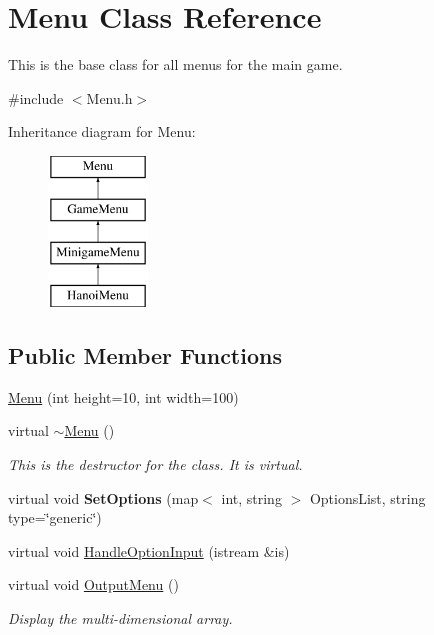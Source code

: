\hypertarget{classMenu}{\section{Menu Class Reference}
\label{classMenu}
}


This is the base class for all menus for the main game.  




{\ttfamily \#include $<$Menu.\-h$>$}

Inheritance diagram for Menu\-:\begin{figure}[H]
\begin{center}
\leavevmode
\includegraphics[height=4.000000cm]{classMenu}
\end{center}
\end{figure}
\subsection*{Public Member Functions}
\begin{DoxyCompactItemize}
\item 
\hyperlink{classMenu_a5a60e837b160444bee4525c06fd4c51e}{Menu} (int height=10, int width=100)
\item 
\hypertarget{classMenu_a831387f51358cfb88cd018e1777bc980}{virtual \hyperlink{classMenu_a831387f51358cfb88cd018e1777bc980}{$\sim$\-Menu} ()}\label{classMenu_a831387f51358cfb88cd018e1777bc980}

\begin{DoxyCompactList}\small\item\em This is the destructor for the class. It is virtual. \end{DoxyCompactList}\item 
\hypertarget{classMenu_a8451a530cd2b53f456658f8741ae45bb}{virtual void {\bfseries Set\-Options} (map$<$ int, string $>$ Options\-List, string type=\char`\"{}generic\char`\"{})}\label{classMenu_a8451a530cd2b53f456658f8741ae45bb}

\item 
virtual void \hyperlink{classMenu_a81bb84f921911944e4060d1c5a1b2507}{Handle\-Option\-Input} (istream \&is)
\item 
\hypertarget{classMenu_a4665a914fe24a8b11d8d6c95792184b3}{virtual void \hyperlink{classMenu_a4665a914fe24a8b11d8d6c95792184b3}{Output\-Menu} ()}\label{classMenu_a4665a914fe24a8b11d8d6c95792184b3}

\begin{DoxyCompactList}\small\item\em Display the multi-\/dimensional array. \end{DoxyCompactList}\end{DoxyCompactItemize}

